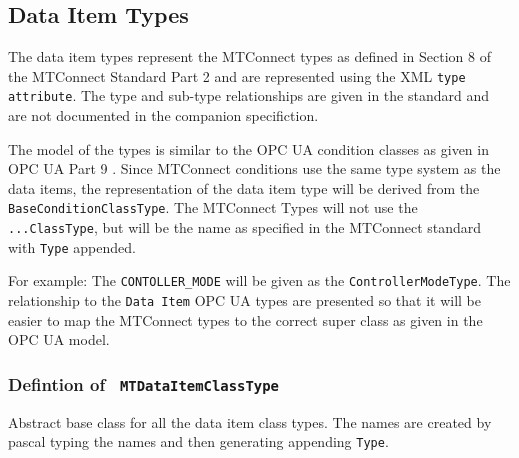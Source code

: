 \FloatBarrier
\subsection{Data Item Types} \label{model:DataItemTypes}

The data item types represent the MTConnect types as defined in Section 8 of the 
MTConnect Standard Part 2 \cite{MTCPart2} and are represented using the XML \texttt{type} 
\texttt{attribute}. The type and sub-type relationships are given in the standard and are 
not documented in the companion specifiction. 

The model of the types is similar to the OPC UA condition classes as given in OPC UA Part 9
\cite{UAPart9}. Since MTConnect conditions use the same type system as the data items, 
the representation of the data item type will be derived from the \texttt{BaseConditionClassType}. 
The MTConnect Types will not use the \texttt{...ClassType}, but will be the name as specified
in the MTConnect standard with \texttt{Type} appended.

For example: The \texttt{CONTOLLER_MODE} will be given as the \texttt{ControllerModeType}. 
The relationship to the \texttt{Data Item} OPC UA types are presented so that it will be
easier to map the MTConnect types to the correct super class as given in the OPC UA model.

\subsubsection{Defintion of \texttt{ MTDataItemClassType}} \label{type:MTDataItemClassType}

\FloatBarrier

Abstract base class for all the data item class types. The names are created by pascal typing the names
and then generating appending \texttt{Type}.

